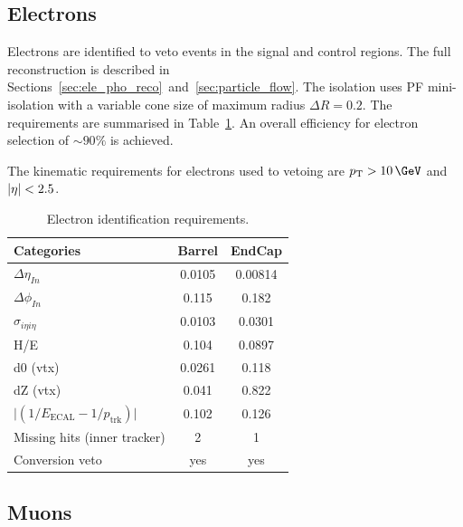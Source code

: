 \subsection{Electrons}

Electrons are identified to veto events in the signal and control regions. The full reconstruction is described in
Sections~\ref{sec:ele_pho_reco}~and~\ref{sec:particle_flow}. The isolation uses PF mini-isolation 
with a variable cone size of maximum radius $\Delta R = 0.2$. The requirements are summarised in 
Table~\ref{tab:ele-id}. An overall efficiency for electron selection of $\sim90\%$ is achieved.

The kinematic requirements for electrons used to vetoing are $\pt > 10\,\GeV$ and $|\eta| < 2.5$.
\begin{table}[h!]
  \caption{Electron identification requirements.\label{tab:ele-id}}
  \centering
  \footnotesize
  \begin{tabular}{ lcc }
    \hline
    \hline
    Categories                                               & Barrel    & EndCap    \\
    \hline
    $\Delta \eta_{In}$                                       & 0.0105   & 0.00814  \\
    $\Delta \phi_{In}$                                       & 0.115    & 0.182  \\
    $\sigma_{i\eta i\eta}$                                   & 0.0103    & 0.0301  \\
    H/E                                                      & 0.104    & 0.0897   \\
    d0 (vtx)                                                 & 0.0261    & 0.118  \\
    dZ (vtx)                                                 & 0.041    & 0.822  \\
    $\lvert(1/E_{\textrm{ECAL}} - 1/p_{\textrm{trk}})\rvert$ & 0.102     & 0.126  \\
    Missing hits (inner tracker)                             & 2         & 1         \\
    Conversion veto                                          & yes       & yes   \\
    \hline
    \hline
  \end{tabular}
  \end{table}
\subsection{Muons}

